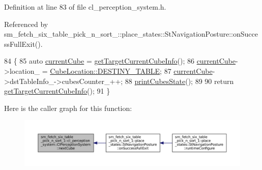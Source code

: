 Definition at line 83 of file cl\+\_\+perception\+\_\+system.\+h.



Referenced by sm\+\_\+fetch\+\_\+six\+\_\+table\+\_\+pick\+\_\+n\+\_\+sort\+\_\+::place\+\_\+states\+::\+St\+Navigation\+Posture\+::on\+Success\+Full\+Exit().


\begin{DoxyCode}
84             \{
85                 \textcolor{keyword}{auto} \hyperlink{classsm__fetch__six__table__pick__n__sort__1_1_1cl__perception__system_1_1ClPerceptionSystem_abdaef89ff802e4e855073c1f2469f03c}{currentCube} = \hyperlink{classsm__fetch__six__table__pick__n__sort__1_1_1cl__perception__system_1_1ClPerceptionSystem_a4103ba8479b122c7af34b3b51102c5d5}{getTargetCurrentCubeInfo}();
86                 \hyperlink{classsm__fetch__six__table__pick__n__sort__1_1_1cl__perception__system_1_1ClPerceptionSystem_abdaef89ff802e4e855073c1f2469f03c}{currentCube}->location\_ = \hyperlink{namespacesm__fetch__six__table__pick__n__sort__1_1_1cl__perception__system_a371363065945abbb60dad8b56601afa0acdc3fdda18904b4a1ac0be036c86f973}{CubeLocation::DESTINY\_TABLE};
87                 \hyperlink{classsm__fetch__six__table__pick__n__sort__1_1_1cl__perception__system_1_1ClPerceptionSystem_abdaef89ff802e4e855073c1f2469f03c}{currentCube}->dstTableInfo\_->cubesCounter\_++;
88                 \hyperlink{classsm__fetch__six__table__pick__n__sort__1_1_1cl__perception__system_1_1ClPerceptionSystem_af3da61c8b8f5ec1686657a1c6dc18f0b}{printCubesState}();
89 
90                 \textcolor{keywordflow}{return} \hyperlink{classsm__fetch__six__table__pick__n__sort__1_1_1cl__perception__system_1_1ClPerceptionSystem_a4103ba8479b122c7af34b3b51102c5d5}{getTargetCurrentCubeInfo}();
91             \}
\end{DoxyCode}
Here is the caller graph for this function\+:
\nopagebreak
\begin{figure}[H]
\begin{center}
\leavevmode
\includegraphics[width=350pt]{classsm__fetch__six__table__pick__n__sort__1_1_1cl__perception__system_1_1ClPerceptionSystem_a5df76b1b2bd090465ac2adf6f7c059d3_icgraph}
\end{center}
\end{figure}

